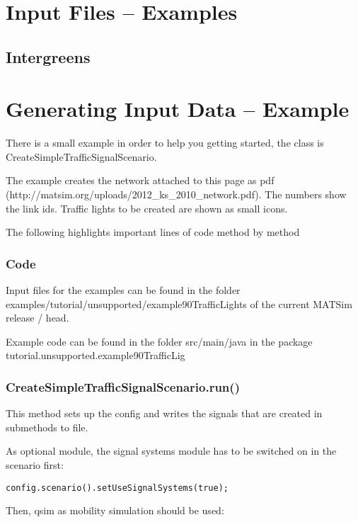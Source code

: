 \section{Input Files -- Examples}

\subsection{Intergreens}
\lstset{breaklines=true,language=XML}



\section{Generating Input Data -- Example}

There is a small example in order to help you getting started, the class is CreateSimpleTrafficSignalScenario.

The example creates the network attached to this page as pdf (http://matsim.org/uploads/2012\_ks\_2010\_network.pdf). The numbers show the link ids. Traffic lights to be created are shown as small icons.

The following highlights important lines of code method by method

\subsubsection{Code}

Input files for the examples can be found in the folder examples/tutorial/unsupported/example90TrafficLights of the current MATSim release / head.

Example code can be found in the folder src/main/java in the package tutorial.unsupported.example90TrafficLig

\subsubsection{CreateSimpleTrafficSignalScenario.run()}

This method sets up the config and writes the signals that are created in submethods to file.

As optional module, the signal systems module has to be switched on in the scenario first:


\texttt{\nolinebreak config.scenario().setUseSignalSystems(true);}

Then, qsim as mobility simulation should be used:


